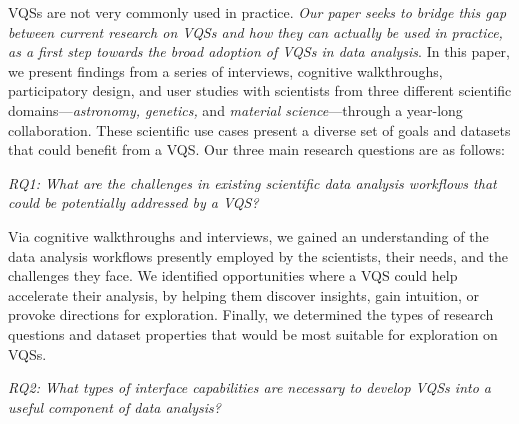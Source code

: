 VQSs are not very commonly used in practice.
{\em Our paper seeks to bridge this gap between current research on VQSs  and how they can actually be used in practice, as a first step towards the broad adoption of VQSs in data analysis}. 
In this paper, we present findings from a series of interviews, cognitive walkthroughs, participatory design, and user studies with scientists from three different scientific 
domains---{\em astronomy, genetics,} and {\em material science}---through a year-long collaboration.
These scientific use cases present a diverse set of goals and datasets that could benefit from a VQS. Our three main research questions are as follows:


\emph{RQ1: What are the challenges in existing scientific data analysis workflows that could be potentially addressed by a VQS?}

Via cognitive walkthroughs and interviews,
we gained an understanding of the data analysis 
workflows presently employed by the scientists, their needs,
and the challenges they face. 
We identified opportunities where a VQS could
help accelerate their analysis, by helping them
discover insights, gain intuition, or provoke directions
for exploration. Finally, we determined the types of 
research questions and dataset properties that would
be most suitable for exploration on VQSs.

\emph{RQ2: What types of interface capabilities are necessary to develop VQSs into a useful component of data analysis?}


